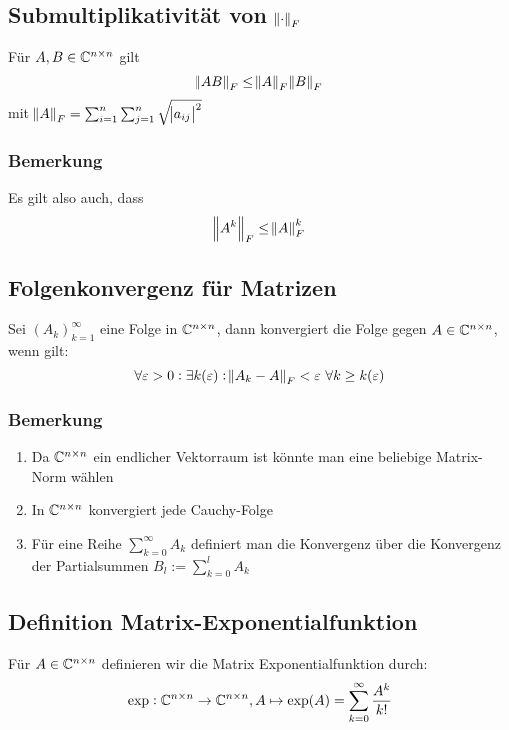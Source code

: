 \subsection{Submultiplikativität von $\norm{\cdot}_F$}
Für $A,B \in \mathbb{C}^{n \times n}$ gilt
\begin{equation*}
	\norm{A B}_F \leq \norm{A}_F \norm{B}_F
\end{equation*}
mit $\norm{A}_F = \sum_{i=1}^n \sum_{j=1}^n \sqrt{ \abs{a_{ij}}^2}$

\subsubsection{Bemerkung}
Es gilt also auch, dass
\begin{equation*}
 	\norm{A^k}_F \leq \norm{A}_F^k
\end{equation*}

\subsection{Folgenkonvergenz für Matrizen}
Sei ${(A_k)}_{k=1}^\infty$ eine Folge in $\mathbb{C}^{n \times n}$, dann konvergiert die Folge gegen $A \in \mathbb{C}^{n \times n}$,
wenn gilt:
\begin{equation*}
	\forall \varepsilon > 0: \exists k(\varepsilon): \norm{A_k - A}_F < \varepsilon\ \forall k \geq k(\varepsilon)
\end{equation*}

\subsubsection{Bemerkung}
\begin{enumerate}[label= (\alph*)]
	\item Da $\mathbb{C}^{n \times n}$ ein endlicher Vektorraum ist könnte man eine beliebige Matrix-Norm wählen
	\item In $\mathbb{C}^{n \times n}$ konvergiert jede Cauchy-Folge
	\item Für eine Reihe $\sum_{k=0}^\infty A_k$ definiert man die Konvergenz über die Konvergenz der Partialsummen
		$B_l := \sum_{k=0}^l A_k$
\end{enumerate}

\subsection{Definition Matrix-Exponentialfunktion}
Für $A \in \mathbb{C}^{n \times n}$ definieren wir die Matrix Exponentialfunktion durch:
\begin{equation*}
	\exp: \mathbb{C}^{n \times n} \to \mathbb{C}^{n \times n}, A \mapsto \exp(A) = \sum_{k=0}^\infty \frac{A^k}{k!}
\end{equation*}

